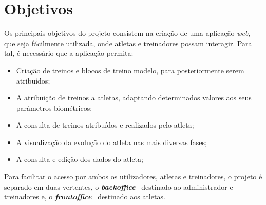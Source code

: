 \section{Objetivos}

Os principais objetivos do projeto consistem na criação de uma aplicação \textit{web}, que seja fácilmente utilizada, onde atletas e treinadores possam interagir. Para tal, é necessário que a aplicação permita:

\begin{itemize}
	\item Criação de treinos e blocos de treino modelo, para posteriormente serem atribuídos;
	\item A atribuição de treinos a atletas, adaptando determinados valores aos seus parâmetros biométricos;
	\item A consulta de treinos atribuídos e realizados pelo atleta;
	\item A visualização da evolução do atleta nas mais diversas fases;
	\item A consulta e edição dos dados do atleta;
\end{itemize}

Para facilitar o acesso por ambos os utilizadores, atletas e treinadores, o projeto é separado em duas vertentes, o \textit{\textbf{backoffice}} \textemdash~destinado ao administrador e treinadores e, o \textbf{\textit{frontoffice}} \textemdash~destinado aos atletas.
